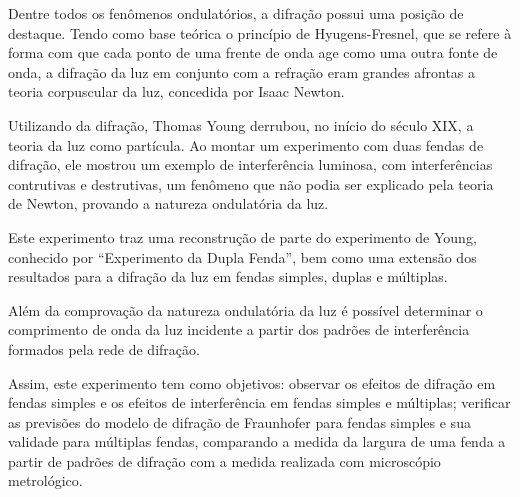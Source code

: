 Dentre todos os fenômenos ondulatórios, a difração possui uma posição de destaque. Tendo como base teórica o princípio de Hyugens-Fresnel, que se refere à forma com que cada ponto de uma frente de onda age como uma outra fonte de onda, a difração da luz em conjunto com a refração eram grandes afrontas a teoria corpuscular da luz, concedida por Isaac Newton.

Utilizando da difração, Thomas Young derrubou, no início do século XIX, a teoria da luz como partícula. Ao montar um experimento com duas fendas de difração, ele mostrou um exemplo de interferência luminosa, com interferências contrutivas e destrutivas, um fenômeno que não podia ser explicado pela teoria de Newton, provando a natureza ondulatória da luz.

Este experimento traz uma reconstrução de parte do experimento de Young, conhecido por “Experimento da Dupla Fenda”, bem como uma extensão dos resultados para a difração da luz em fendas simples, duplas e múltiplas.

Além da comprovação da natureza ondulatória da luz é possível determinar o comprimento de onda da luz incidente a partir dos padrões de interferência formados pela rede de difração.

Assim, este experimento tem como objetivos: observar os efeitos de difração em fendas simples e os efeitos de interferência em fendas simples e múltiplas; verificar as previsões do modelo de difração de Fraunhofer para fendas simples e sua validade para múltiplas fendas, comparando a medida da largura de uma fenda a partir de padrões de difração com a medida realizada com microscópio metrológico.

